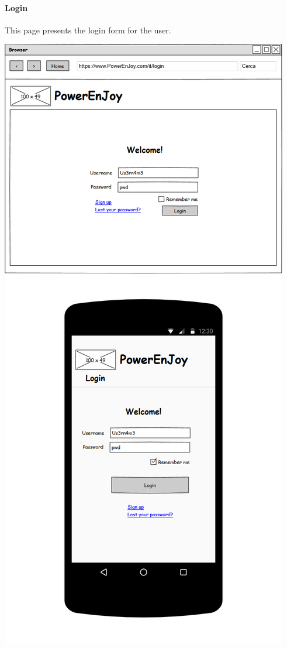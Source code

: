 \documentclass{article}
\begin{document}
			\paragraph{Login} This page presents the login form for the user.
			\begin{center}
				\includegraphics[width=0.6\linewidth]{"img/ui/login"}
			\end{center}
			\pagebreak
			
\end{document}
